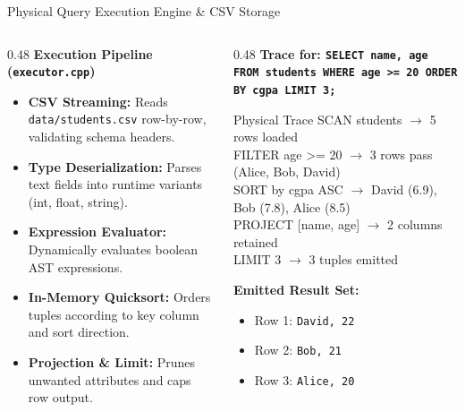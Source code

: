 \documentclass[aspectratio=169,10pt]{beamer}
\begin{document}
\begin{frame}{Physical Query Execution Engine \& CSV Storage}
    \begin{columns}[T]
        \begin{column}{0.48\textwidth}
            \textbf{Execution Pipeline (\texttt{executor.cpp})}
            \begin{itemize}\footnotesize
                \item \textbf{CSV Streaming:} Reads \texttt{data/students.csv} row-by-row, validating schema headers.
                \item \textbf{Type Deserialization:} Parses text fields into runtime variants (int, float, string).
                \item \textbf{Expression Evaluator:} Dynamically evaluates boolean AST expressions.
                \item \textbf{In-Memory Quicksort:} Orders tuples according to key column and sort direction.
                \item \textbf{Projection \& Limit:} Prunes unwanted attributes and caps row output.
            \end{itemize}
        \end{column}
        \begin{column}{0.48\textwidth}
            \textbf{Trace for: \texttt{SELECT name, age FROM students WHERE age >= 20 ORDER BY cgpa LIMIT 3;}}
            \begin{block}{Physical Trace}\footnotesize
                SCAN students $\to$ 5 rows loaded\\
                FILTER age >= 20 $\to$ 3 rows pass (Alice, Bob, David)\\
                SORT by cgpa ASC $\to$ David (6.9), Bob (7.8), Alice (8.5)\\
                PROJECT [name, age] $\to$ 2 columns retained\\
                LIMIT 3 $\to$ 3 tuples emitted
            \end{block}
            \textbf{Emitted Result Set:}
            \begin{itemize}\footnotesize
                \item Row 1: \texttt{David, 22}
                \item Row 2: \texttt{Bob, 21}
                \item Row 3: \texttt{Alice, 20}
            \end{itemize}
        \end{column}
    \end{columns}
\end{frame}
\end{document}
